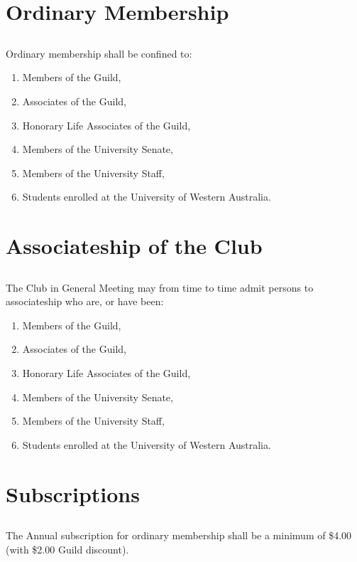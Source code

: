 \documentclass[10.5pt]{article}
\begin{document}
\section{Ordinary Membership}
\subsection{}
Ordinary membership shall be confined to:
\begin{enumerate}[label=(\alph*)]
    \item Members of the Guild,
    \item Associates of the Guild,
    \item Honorary Life Associates of the Guild,
    \item Members of the University Senate,
    \item Members of the University Staff,
    \item Students enrolled at the University of Western Australia.
\end{enumerate}


\section{Associateship of the Club}
\subsection{}
The Club in General Meeting may from time to time admit persons to associateship who are, or have been:
\begin{enumerate}[label=(\alph*)]
    \item Members of the Guild,
    \item Associates of the Guild,
    \item Honorary Life Associates of the Guild,
    \item Members of the University Senate,
    \item Members of the University Staff,
    \item Students enrolled at the University of Western Australia.
    \newline
\end{enumerate}


\section{Subscriptions}
\subsection{}
The Annual subscription for ordinary membership shall be a minimum of \$4.00 (with \$2.00 Guild discount).
\newline
\end{document}
